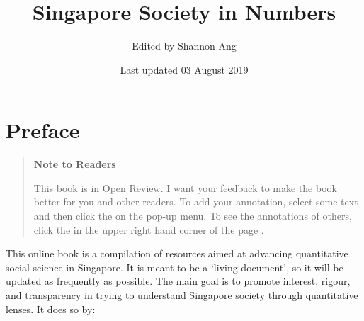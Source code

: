 \documentclass[openany]{book}
\title{Singapore Society in Numbers}
\author{Edited by Shannon Ang}
\date{Last updated 03 August 2019}
\begin{document}
\maketitle

{
\setcounter{tocdepth}{1}
\tableofcontents
}
\chapter*{Preface}\label{preface}

\begin{quote}
\textbf{Note to Readers}

This book is in Open Review. I want your feedback to make the book
better for you and other readers. To add your annotation, {select some
text} and then click the on the pop-up menu. To see the annotations of
others, click the in the upper right hand corner of the page .
\end{quote}

This online book is a compilation of resources aimed at advancing
quantitative social science in Singapore. It is meant to be a `living
document', so it will be updated as frequently as possible. The main
goal is to promote interest, rigour, and transparency in trying to
understand Singapore society through quantitative lenses. It does so by:
\end{document}
